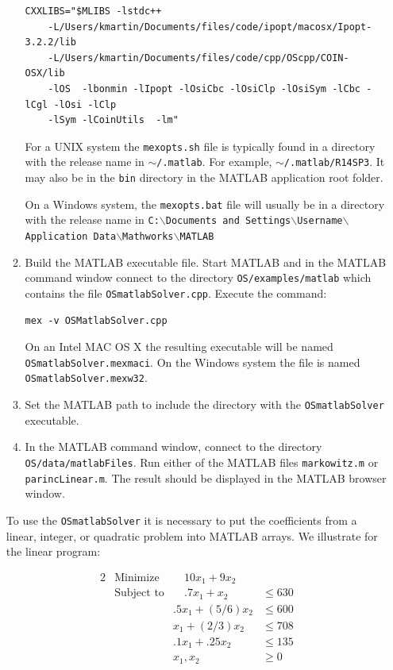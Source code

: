 \documentclass[11pt]{article}
\renewcommand{\_}{{\char"5F}}
\renewcommand{\{}{{\char"7B}}
\renewcommand{\}}{{\char"7D}}
\renewcommand{\^}{{\char"0D}}
\renewcommand{\'}{{\char"0D}}
\begin{document}
\begin{enumerate}[Step 1:]
\begin{enumerate}[{\bf Step 1:}]
\begin{verbatim}
CXXLIBS="$MLIBS -lstdc++
    -L/Users/kmartin/Documents/files/code/ipopt/macosx/Ipopt-3.2.2/lib
    -L/Users/kmartin/Documents/files/code/cpp/OScpp/COIN-OSX/lib
    -lOS  -lbonmin -lIpopt -lOsiCbc -lOsiClp -lOsiSym -lCbc -lCgl -lOsi -lClp
    -lSym -lCoinUtils  -lm"
\end{verbatim}

For a UNIX system the {\tt mexopts.sh} file  is typically  found in a directory with the release name in 
{\tt  $\sim$/.matlab}. For example, {\tt $\sim$/.matlab/R14SP3}.  It may also be in the {\tt bin} directory 
in the MATLAB application root folder.


On a Windows system, the {\tt  mexopts.bat} file will usually be in a directory with the release name in 
{\tt C:$\backslash$Documents and Settings$\backslash$Username$\backslash$Application Data$\backslash$Mathworks$\backslash$MATLAB}


\item{}  Build the MATLAB executable file. Start MATLAB and in the MATLAB command window connect to the directory {\tt OS/examples/matlab} which  contains the file {\tt OSmatlabSolver.cpp}.    Execute the command:

\begin{verbatim}
mex -v OSMatlabSolver.cpp
\end{verbatim}

On an Intel MAC OS X the resulting executable will be named {\tt OSmatlabSolver.mexmaci}. On the Windows system the file is named {\tt OSmatlabSolver.mexw32}.

\item{}  Set the MATLAB path to include the directory with the {\tt OSmatlabSolver} executable.


\item{}   In the MATLAB command window, connect to the directory {\tt OS/data/matlabFiles}. Run either of the MATLAB
files {\tt markowitz.m} or {\tt parincLinear.m}.  The result should be displayed in the MATLAB browser window.

\end{enumerate}


To use the {\tt OSmatlabSolver} it is necessary to put the coefficients  from a linear, integer, or quadratic problem into MATLAB arrays.   We illustrate for the linear program:

\begin{alignat}{2}
& \mbox{Minimize} & \quad
10 x_{1} + 9 x_{2}\label{eq:parinobj}\\
& \mbox{Subject to} & \quad .7x_{1} + x_{2}  &\le 630  \label{eq:parinccon1}\\
& & .5x_{1} + (5/6) x_{2} &\le 600 \label{eq:parinccon2}\\
& &  x_{1} + (2/3) x_{2} &\le 708 \label{eq:parinccon3}\\
& & .1x_{1} + .25 x_{2} &\le 135 \label{eq:parinccon4}\\
& & x_{1}, x_{2} &\ge 0 \label{eq:parincnonneg}
\end{alignat}


\end{enumerate}
\end{document}
